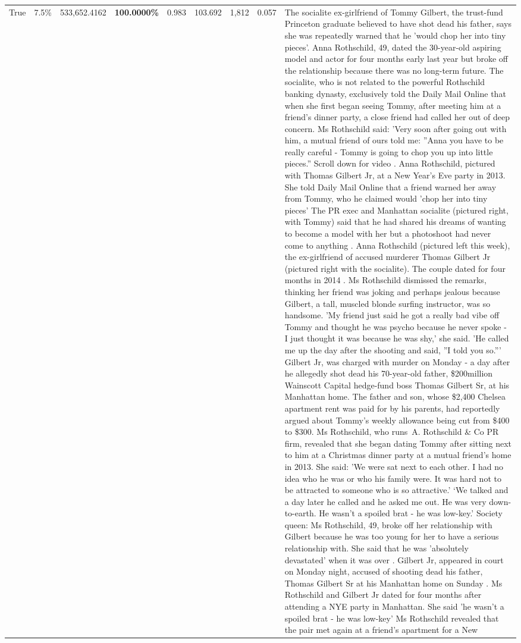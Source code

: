 \begin{table}[H]
\begin{tabular}{lllrlllll}
True & 7.5\% & 533,652.4162 & \bfseries \color{red} 100.0000\% & 0.983 & 103.692 & 1,812 & 0.057 & The socialite ex-girlfriend of Tommy Gilbert, the trust-fund Princeton graduate believed to have shot dead his father, says she was repeatedly warned that he 'would chop her into tiny pieces'. Anna Rothschild, 49, dated the 30-year-old aspiring model and actor for four months early last year but broke off the relationship because there was no long-term future. The socialite, who is not related to the powerful Rothschild banking dynasty, exclusively told the Daily Mail Online that when she first began seeing Tommy, after meeting him at a friend's dinner party, a close friend had called her out of deep concern. Ms Rothschild said: 'Very soon after going out with him, a mutual friend of ours told me: ''Anna you have to be really careful - Tommy is going to chop you up into little pieces.'' Scroll down for video . Anna Rothschild, pictured with Thomas Gilbert Jr, at a New Year's Eve party in 2013. She told Daily Mail Online that a friend warned her away from Tommy, who he claimed would 'chop her into tiny pieces' The PR exec and Manhattan socialite (pictured right, with Tommy) said that he had shared his dreams of wanting to become a model with her but a photoshoot had never come to anything . Anna Rothschild (pictured left this week), the ex-girlfriend of accused murderer Thomas Gilbert Jr (pictured right with the socialite). The couple dated for four months in 2014 . Ms Rothschild dismissed the remarks, thinking her friend was joking and perhaps jealous because Gilbert, a tall, muscled blonde surfing instructor, was so handsome. 'My friend just said he got a really bad vibe off Tommy and thought he was psycho because he never spoke - I just thought it was because he was shy,' she said. 'He called me up the day after the shooting and said, ''I told you so.''' Gilbert Jr, was charged with murder on Monday - a day after he allegedly shot dead his 70-year-old father, \$200million Wainscott Capital hedge-fund boss Thomas Gilbert Sr, at his Manhattan home. The father and son, whose \$2,400 Chelsea apartment rent was paid for by his parents, had reportedly argued about Tommy's weekly allowance being cut from \$400 to \$300. Ms Rothschild, who runs A. Rothschild \& Co PR firm, revealed that she began dating Tommy after sitting next to him at a Christmas dinner party at a mutual friend's home in 2013. She said: 'We were sat next to each other. I had no idea who he was or who his family were. It was hard not to be attracted to someone who is so attractive.' ‘We talked and a day later he called and he asked me out. He was very down-to-earth. He wasn’t a spoiled brat - he was low-key.’ Society queen: Ms Rothschild, 49, broke off her relationship with Gilbert because he was too young for her to have a serious relationship with. She said that he was 'absolutely devastated' when it was over . Gilbert Jr, appeared in court on Monday night, accused of shooting dead his father, Thomas Gilbert Sr at his Manhattan home on Sunday . Ms Rothschild and Gilbert Jr dated for four months after attending a NYE party in Manhattan. She said 'he wasn't a spoiled brat - he was low-key' Ms Rothschild revealed that the pair met again at a friend’s apartment for a New 
\end{tabular}
\end{table}
